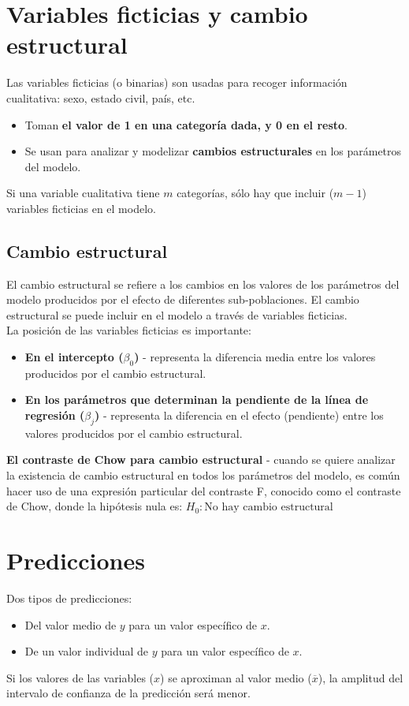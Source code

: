 \documentclass[10pt, a4paper, landscape]{extarticle}
\begin{document}
\begin{multicols}{3}
\section*{Variables ficticias y cambio estructural}
	Las variables ficticias (o binarias) son usadas para recoger información cualitativa: sexo, estado civil, país, etc.
	\begin{itemize}[leftmargin=*]
		\item Toman \textbf{el valor de 1 en una categoría dada, y 0 en el resto}.
		\item Se usan para analizar y modelizar \textbf{cambios estructurales} en los parámetros del modelo.
	\end{itemize}
	Si una variable cualitativa tiene $m$ categorías, sólo hay que incluir ($m-1$) variables ficticias en el modelo.
	\subsection*{Cambio estructural}
		El cambio estructural se refiere a los cambios en los valores de los parámetros del modelo producidos por el efecto de diferentes sub-poblaciones. El cambio estructural se puede incluir en el modelo a través de variables ficticias.
		\\ La posición de las variables ficticias es importante:
		\begin{itemize}[leftmargin=*]
			\item \textbf{En el intercepto ($\beta_0$)} - representa la diferencia media entre los valores producidos por el cambio estructural.
			\item \textbf{En los parámetros que determinan la pendiente de la línea de regresión ($\beta_j$)} - representa la diferencia en el efecto (pendiente) entre los valores producidos por el cambio estructural.
		\end{itemize}
		\textbf{El contraste de Chow para cambio estructural} - cuando se quiere analizar la existencia de cambio estructural en todos los parámetros del modelo, es común hacer uso de una expresión particular del contraste F, conocido como el contraste de Chow, donde la hipótesis nula es: $H_0: \text{No hay cambio estructural}$

\section*{Predicciones}
	Dos tipos de predicciones:
	\begin{itemize}[leftmargin=*]
		\item Del valor medio de $y$ para un valor específico de $x$.
		\item De un valor individual de $y$ para un valor específico de $x$.
	\end{itemize}
	Si los valores de las variables ($x$) se aproximan al valor medio ($\overline{x}$), la amplitud del intervalo de confianza de la predicción será menor. 
\columnbreak

\end{multicols}
\end{document}
